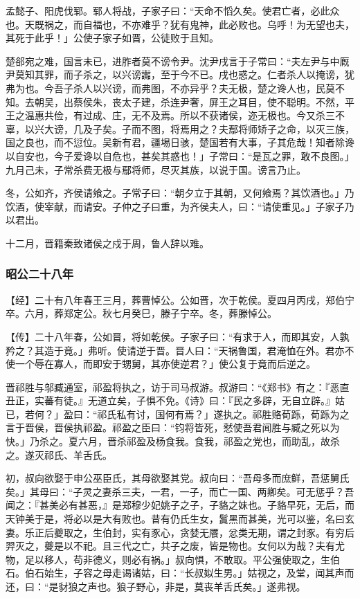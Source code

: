 \documentclass[]{article}
\begin{document}
孟懿子、阳虎伐郓。郓人将战，子家子曰：``天命不慆久矣。使君亡者，必此众也。天既祸之，而自福也，不亦难乎？犹有鬼神，此必败也。乌呼！为无望也夫，其死于此乎！」公使子家子如晋，公徒败于且知。

楚郤宛之难，国言未已，进胙者莫不谤令尹。沈尹戌言于子常曰：``夫左尹与中厩尹莫知其罪，而子杀之，以兴谤讟，至于今不已。戌也惑之。仁者杀人以掩谤，犹弗为也。今吾子杀人以兴谤，而弗图，不亦异乎？夫无极，楚之谗人也，民莫不知。去朝吴，出蔡侯朱，丧太子建，杀连尹奢，屏王之耳目，使不聪明。不然，平王之温惠共俭，有过成、庄，无不及焉。所以不获诸侯，迩无极也。今又杀三不辜，以兴大谤，几及子矣。子而不图，将焉用之？夫鄢将师矫子之命，以灭三族，国之良也，而不愆位。吴新有君，疆埸日骇，楚国若有大事，子其危哉！知者除谗以自安也，今子爱谗以自危也，甚矣其惑也！」子常曰：``是瓦之罪，敢不良图。」九月己未，子常杀费无极与鄢将师，尽灭其族，以说于国。谤言乃止。

冬，公如齐，齐侯请飨之。子常子曰：``朝夕立于其朝，又何飨焉？其饮酒也。」乃饮酒，使宰献，而请安。子仲之子曰重，为齐侯夫人，曰：``请使重见。」子家子乃以君出。

十二月，晋籍秦致诸侯之戍于周，鲁人辞以难。

\hypertarget{header-n2819}{%
\subsubsection{昭公二十八年}\label{header-n2819}}

【经】二十有八年春王三月，葬曹悼公。公如晋，次于乾侯。夏四月丙戌，郑伯宁卒。六月，葬郑定公。秋七月癸巳，滕子宁卒。冬，葬滕悼公。

【传】二十八年春，公如晋，将如乾侯。子家子曰：``有求于人，而即其安，人孰矜之？其造于竟。」弗听。使请逆于晋。晋人曰：``天祸鲁国，君淹恤在外。君亦不使一个辱在寡人，而即安于甥舅，其亦使逆君？」使公复于竟而后逆之。

晋祁胜与邬臧通室，祁盈将执之，访于司马叔游。叔游曰：``《郑书》有之：『恶直丑正，实蕃有徒。』无道立矣，子惧不免。《诗》曰：『民之多辟，无自立辟。』姑已，若何？」盈曰：``祁氏私有讨，国何有焉？」遂执之。祁胜赂荀跞，荀跞为之言于晋侯，晋侯执祁盈。祁盈之臣曰：``钧将皆死，憖使吾君闻胜与臧之死以为快。」乃杀之。夏六月，晋杀祁盈及杨食我。食我，祁盈之党也，而助乱，故杀之。遂灭祁氏、羊舌氏。

初，叔向欲娶于申公巫臣氏，其母欲娶其党。叔向曰：``吾母多而庶鲜，吾惩舅氏矣。」其母曰：``子灵之妻杀三夫，一君，一子，而亡一国、两卿矣。可无惩乎？吾闻之：『甚美必有甚恶，』是郑穆少妃姚子之子，子貉之妹也。子貉早死，无后，而天钟美于是，将必以是大有败也。昔有仍氏生女，鬒黑而甚美，光可以鉴，名曰玄妻。乐正后夔取之，生伯封，实有豕心，贪婪无餍，忿类无期，谓之封豕。有穷后羿灭之，夔是以不祀。且三代之亡，共子之废，皆是物也。女何以为哉？夫有尤物，足以移人，苟非德义，则必有祸。」叔向惧，不敢取。平公强使取之，生伯石。伯石始生，子容之母走谒诸姑，曰：``长叔姒生男。」姑视之，及堂，闻其声而还，曰：``是豺狼之声也。狼子野心，非是，莫丧羊舌氏矣。」遂弗视。
\end{document}
